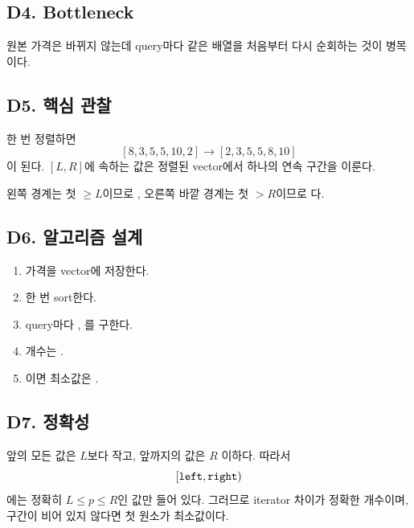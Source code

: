 \subsection{D4. Bottleneck}
원본 가격은 바뀌지 않는데 query마다 같은 배열을 처음부터 다시 순회하는 것이 병목이다.

\subsection{D5. 핵심 관찰}
한 번 정렬하면
\[
[8,3,5,5,10,2]\longrightarrow[2,3,5,5,8,10]
\]
이 된다. $[L,R]$에 속하는 값은 정렬된 vector에서 하나의 연속 구간을 이룬다.

왼쪽 경계는 첫 $\ge L$이므로 , 오른쪽 바깥 경계는 첫 $>R$이므로 다.

\subsection{D6. 알고리즘 설계}
\begin{enumerate}
\item 가격을 vector에 저장한다.
\item 한 번 sort한다.
\item query마다 , 를 구한다.
\item 개수는 .
\item {}이면 최소값은 .
\end{enumerate}

\subsection{D7. 정확성}
 앞의 모든 값은 $L$보다 작고,  앞까지의 값은 $R$ 이하다. 따라서
\[
[\texttt{left},\texttt{right})
\]
에는 정확히 $L\le p\le R$인 값만 들어 있다. 그러므로 iterator 차이가 정확한 개수이며, 구간이 비어 있지 않다면 첫 원소가 최소값이다.

